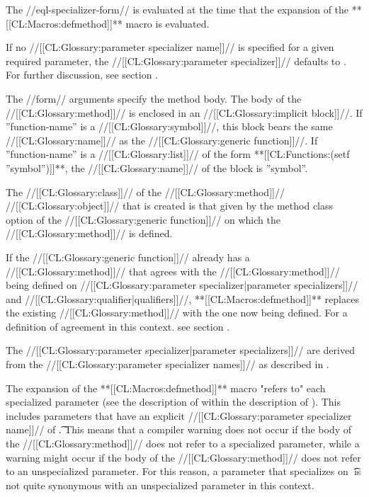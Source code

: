 The //eql-specializer-form// is evaluated at the time that the expansion of the **[[CL:Macros:defmethod]]** macro is evaluated.

If no //[[CL:Glossary:parameter specializer name]]// is specified for a given required parameter, the //[[CL:Glossary:parameter specializer]]// defaults to . For further discussion, see section {\secref\IntroToMethods}.

The //form// arguments specify the method body. The body of the //[[CL:Glossary:method]]// is enclosed in an //[[CL:Glossary:implicit block]]//. If ''function-name'' is a //[[CL:Glossary:symbol]]//, this block bears the same //[[CL:Glossary:name]]// as the //[[CL:Glossary:generic function]]//. If ''function-name'' is a //[[CL:Glossary:list]]// of the form **[[CL:Functions:(setf ''symbol'')]]**, the //[[CL:Glossary:name]]// of the block is ''symbol''.

The //[[CL:Glossary:class]]// of the //[[CL:Glossary:method]]// //[[CL:Glossary:object]]// that is created is that given by the method class option of the //[[CL:Glossary:generic function]]// on which the //[[CL:Glossary:method]]// is defined.

If the //[[CL:Glossary:generic function]]// already has a //[[CL:Glossary:method]]// that agrees with the //[[CL:Glossary:method]]// being defined on //[[CL:Glossary:parameter specializer|parameter specializers]]// and //[[CL:Glossary:qualifier|qualifiers]]//, **[[CL:Macros:defmethod]]** replaces the existing //[[CL:Glossary:method]]// with the one now being defined. For a definition of agreement in this context. see section {\secref\SpecializerQualifierAgreement}.

The //[[CL:Glossary:parameter specializer|parameter specializers]]// are derived from the //[[CL:Glossary:parameter specializer names]]// as described in \secref\IntroToMethods.

The expansion of the **[[CL:Macros:defmethod]]** macro "refers to" each specialized parameter (see the description of  within the description of ). This includes parameters that have an explicit //[[CL:Glossary:parameter specializer name]]// of \t. This means that a compiler warning does not occur if the body of the //[[CL:Glossary:method]]// does not refer to a specialized parameter, while a warning might occur if the body of the //[[CL:Glossary:method]]// does not refer to an unspecialized parameter. For this reason, a parameter that specializes on \t\ is not quite synonymous with an unspecialized parameter in this context.

